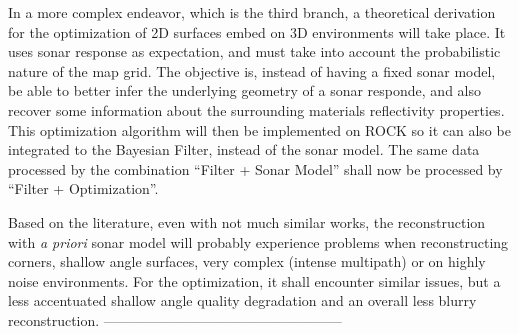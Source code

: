 In a more complex endeavor, which is the third branch, a theoretical derivation
for the optimization of 2D surfaces embed on 3D environments will take place.
It uses sonar response as expectation, and must take into account the
probabilistic nature of the map grid. The objective is, instead of having a
fixed sonar model, be able to better infer the underlying geometry of a sonar
responde, and also recover some information about the surrounding materials
reflectivity properties. This optimization algorithm will then be implemented on
ROCK so it can also be integrated to the Bayesian Filter, instead of the sonar
model. The same data processed by the combination ``Filter + Sonar Model'' shall
now be processed by ``Filter + Optimization''.
 
Based on the literature, even with not much similar works, the reconstruction
with \textit{a priori} sonar model will probably experience problems when
reconstructing corners, shallow angle surfaces, very complex (intense multipath)
or on highly noise environments. For the optimization, it shall encounter
similar issues, but a less accentuated shallow angle quality degradation and an
overall less blurry reconstruction.
---------------------------------------------------